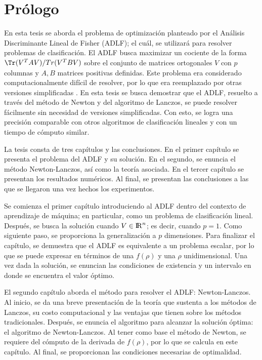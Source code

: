\chapter*{Prólogo}
\label{ch:prologo}


En esta tesis se aborda el problema de optimización planteado por el Análisis Discriminante Lineal de Fisher (ADLF); el cuál, se utilizará para resolver problemas de clasificación. El ADLF busca maximizar un cociente de la forma $\Tr(V^T A V) / Tr(V^T B V)$ sobre el conjunto de matrices ortogonales $V$ con $p$ columnas y $A, B$ matrices positivas definidas. Este problema era considerado computacionalmente difícil de resolver, por lo que era reemplazado por otras versiones simplificadas \cite{ngo2012trace} \cite{wang2007trace}. En esta tesis se busca demostrar que el ADLF, resuelto a través del método de Newton y del algoritmo de Lanczos, se puede resolver fácilmente sin necesidad de versiones simplificadas. Con esto, se logra una precisión comparable con otros algoritmos de clasificación lineales y con un tiempo de cómputo similar. 

La tesis consta de tres capítulos y las conclusiones. En el primer capítulo se presenta el problema del ADLF y su solución. En el segundo, se enuncia el método Newton-Lanczos, así como la teoría asociada. En el tercer capítulo se presentan los resultados numéricos. Al final, se presentan las conclusiones a las que se llegaron una vez hechos los experimentos.

Se comienza el primer capítulo introduciendo al ADLF dentro del contexto de aprendizaje de máquina; en particular, como un problema de clasificación lineal. Después, se busca la solución cuando $V \in {\rm I\!R}^{n}$; es decir, cuando $p = 1$. Como siguiente paso, se proporciona la generalización a $p$ dimensiones. Para finalizar el capítulo, se demuestra que el ADLF es equivalente a un problema escalar, por lo que se puede expresar en términos de una $f(\rho)$ y una $\rho$ unidimensional. Una vez dada la solución, se enuncian las condiciones de existencia y un intervalo en donde se encuentra el valor óptimo.

El segundo capítulo aborda el método para resolver el ADLF: Newton-Lanczos. Al inicio, se da una breve presentación de la teoría que sustenta a los métodos de Lanczos, su costo computacional y las ventajas que tienen sobre los métodos tradicionales. Después, se enuncia el algoritmo para alcanzar la solución óptima: el algoritmo de Newton-Lanczos. Al tener como base el método de Newton, se requiere del cómputo de la derivada de $f(\rho)$, por lo que se calcula en este capítulo. Al final, se proporcionan las condiciones necesarias de optimalidad.

